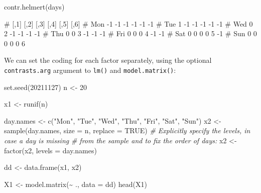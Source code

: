 \documentclass[
  a4paper,
]{article}
\newenvironment{Shaded}{\begin{snugshade}}{\end{snugshade}}
\newcommand{\AttributeTok}[1]{\textcolor[rgb]{0.77,0.63,0.00}{#1}}
\newcommand{\CommentTok}[1]{\textcolor[rgb]{0.56,0.35,0.01}{\textit{#1}}}
\newcommand{\ConstantTok}[1]{\textcolor[rgb]{0.00,0.00,0.00}{#1}}
\newcommand{\DecValTok}[1]{\textcolor[rgb]{0.00,0.00,0.81}{#1}}
\newcommand{\FunctionTok}[1]{\textcolor[rgb]{0.00,0.00,0.00}{#1}}
\newcommand{\NormalTok}[1]{#1}
\newcommand{\OtherTok}[1]{\textcolor[rgb]{0.56,0.35,0.01}{#1}}
\newcommand{\SpecialCharTok}[1]{\textcolor[rgb]{0.00,0.00,0.00}{#1}}
\newcommand{\StringTok}[1]{\textcolor[rgb]{0.31,0.60,0.02}{#1}}
\theoremstyle{definition}
\theoremstyle{definition}
\theoremstyle{definition}
\theoremstyle{definition}
\theoremstyle{remark}
\begin{document}
\begin{itemize}
\begin{Shaded}
\begin{Highlighting}[]
\FunctionTok{contr.helmert}\NormalTok{(days)}
\end{Highlighting}
\end{Shaded}

\begin{Shaded}
\begin{Highlighting}[]
\NormalTok{\#     [,1] [,2] [,3] [,4] [,5] [,6]}
\NormalTok{\# Mon   {-}1   {-}1   {-}1   {-}1   {-}1   {-}1}
\NormalTok{\# Tue    1   {-}1   {-}1   {-}1   {-}1   {-}1}
\NormalTok{\# Wed    0    2   {-}1   {-}1   {-}1   {-}1}
\NormalTok{\# Thu    0    0    3   {-}1   {-}1   {-}1}
\NormalTok{\# Fri    0    0    0    4   {-}1   {-}1}
\NormalTok{\# Sat    0    0    0    0    5   {-}1}
\NormalTok{\# Sun    0    0    0    0    0    6}
\end{Highlighting}
\end{Shaded}
\end{itemize}

We can set the coding for each factor separately, using the
optional \texttt{contrasts.arg} argument to \texttt{lm()} and \texttt{model.matrix()}:

\begin{Shaded}
\begin{Highlighting}[]
\FunctionTok{set.seed}\NormalTok{(}\DecValTok{20211127}\NormalTok{)}
\NormalTok{n }\OtherTok{\textless{}{-}} \DecValTok{20}

\NormalTok{x1 }\OtherTok{\textless{}{-}} \FunctionTok{runif}\NormalTok{(n)}

\NormalTok{day.names }\OtherTok{\textless{}{-}} \FunctionTok{c}\NormalTok{(}\StringTok{"Mon"}\NormalTok{, }\StringTok{"Tue"}\NormalTok{, }\StringTok{"Wed"}\NormalTok{, }\StringTok{"Thu"}\NormalTok{, }\StringTok{"Fri"}\NormalTok{, }\StringTok{"Sat"}\NormalTok{, }\StringTok{"Sun"}\NormalTok{)}
\NormalTok{x2 }\OtherTok{\textless{}{-}} \FunctionTok{sample}\NormalTok{(day.names, }\AttributeTok{size =}\NormalTok{ n, }\AttributeTok{replace =} \ConstantTok{TRUE}\NormalTok{)}
\CommentTok{\# Explicitly specify the levels, in case a day is missing}
\CommentTok{\# from the sample and to fix the order of days:}
\NormalTok{x2 }\OtherTok{\textless{}{-}} \FunctionTok{factor}\NormalTok{(x2, }\AttributeTok{levels =}\NormalTok{ day.names)}

\NormalTok{dd }\OtherTok{\textless{}{-}} \FunctionTok{data.frame}\NormalTok{(x1, x2)}

\NormalTok{X1 }\OtherTok{\textless{}{-}} \FunctionTok{model.matrix}\NormalTok{(}\SpecialCharTok{\textasciitilde{}}\NormalTok{ ., }\AttributeTok{data =}\NormalTok{ dd)}
\FunctionTok{head}\NormalTok{(X1)}
\end{Highlighting}
\end{Shaded}
\end{document}
